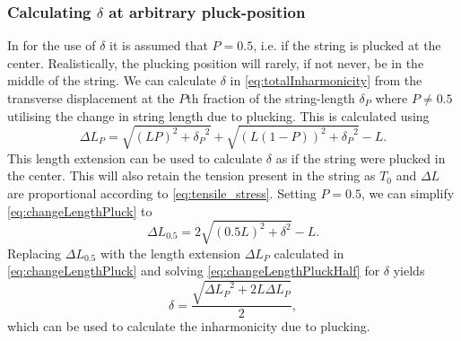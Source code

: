 \documentclass{article}
\begin{document}
\begin{sloppy}
\subsubsection{Calculating $\delta$ at arbitrary pluck-position}
In \cite{rossing:science_of_string_instruments} for the use of $\delta$ it is assumed that $P=0.5$, i.e. if the string is plucked at the center. Realistically, the plucking position will rarely, if not never, be in the middle of the string. We can calculate $\delta$ in \eqref{eq:totalInharmonicity} from the transverse displacement at the $P$th fraction of the string-length $\delta_P$ where $P \neq 0.5$ utilising the change in string length due to plucking. This is calculated using
\begin{equation}\label{eq:changeLengthPluck}
    \Delta L_P = \sqrt{(LP)^2+{\delta_P}^2}+\sqrt{(L(1-P))^2+{\delta_P}^2} - L.
\end{equation}
This length extension can be used to calculate $\delta$ as if the string were plucked in the center. This will also retain the tension present in the string as $T_0$ and $\Delta L$ are proportional according to \eqref{eq:tensile_stress}. Setting $P = 0.5$, we can simplify \eqref{eq:changeLengthPluck} to
%
\begin{equation}\label{eq:changeLengthPluckHalf}
    \Delta L_{0.5} = 2\sqrt{(0.5L)^2 + \delta^2} - L.
\end{equation}
%
Replacing $\Delta L_{0.5}$ with the length extension $\Delta L_P$ calculated in \eqref{eq:changeLengthPluck} and solving \eqref{eq:changeLengthPluckHalf} for $\delta$ yields
\begin{equation}
    \delta = \frac{\sqrt{{\Delta L_P}^2+2L\Delta L_P}}{2},
\end{equation}
which can be used to calculate the inharmonicity due to plucking.


\end{sloppy}
\end{document}
